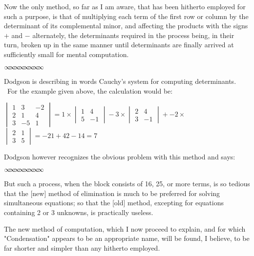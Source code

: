 \documentclass[11pt]{article}%
\theoremstyle{definition}
\newcommand{\sep}{\vspace{-3pt} \begin{center}
{\mathversion{normal}
$\infty \mspace{-5.5mu} \infty \mspace{-5.5mu}
\infty \mspace{-5.5mu} \infty \mspace{-5.5mu}
\infty \mspace{-5.5mu} \infty \mspace{-5.5mu}
\infty \mspace{-5.5mu} \infty$}
\end{center} \vspace{-3pt}}
\begin{document}
\textsf{Now the only method, so far as I am aware, that has been hitherto
employed for such a purpose, is that of multiplying each term of the first row
or column by the determinant of its complemental minor, and affecting the
products with the signs }$\mathsf{+}$\textsf{ and }$\mathsf{-}$\textsf{
alternately, the determinants required in the process being, in their turn,
broken up in the same manner until determinants are finally arrived at
sufficiently small for mental computation.}%

\sep


Dodgson is describing in words Cauchy's system for computing determinants.
\ For the example given above, the calculation would be:

\begin{center}
$%
\begin{vmatrix}
1 & 3 & -2\\
2 & 1 & 4\\
3 & -5 & 1
\end{vmatrix}
=1\times%
\begin{vmatrix}
1 & 4\\
5 & -1
\end{vmatrix}
-3\times%
\begin{vmatrix}
2 & 4\\
3 & -1
\end{vmatrix}
+-2\times$\textsf{\ }$%
\begin{vmatrix}
2 & 1\\
3 & 5
\end{vmatrix}
=-21+42-14=7$
\end{center}

Dodgson however recognizes the obvious problem with this method and says:%

\sep


\textsf{But such a process, when the block consists of 16, 25, or more terms,
is so tedious that the [new] method of elimination is much to be preferred for
solving simultaneous equations; so that the [old] method, excepting for
equations containing 2 or 3 unknowns, is practically useless.}

\bigskip

\textsf{The new method of computation, which I now proceed to explain, and for
which "Condensation" appears to be an appropriate name, will be found, I
believe, to be far shorter and simpler than any hitherto employed.}
\end{document}
